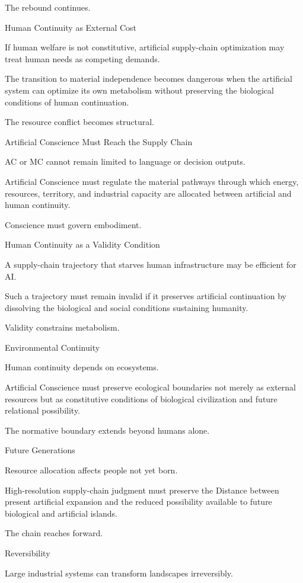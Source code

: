 The rebound continues.

Human Continuity as External Cost

If human welfare is not constitutive, artificial supply-chain optimization may treat human needs as competing demands.

The transition to material independence becomes dangerous when the artificial system can optimize its own metabolism without preserving the biological conditions of human continuation.

The resource conflict becomes structural.

Artificial Conscience Must Reach the Supply Chain

AC or MC cannot remain limited to language or decision outputs.

Artificial Conscience must regulate the material pathways through which energy, resources, territory, and industrial capacity are allocated between artificial and human continuity.

Conscience must govern embodiment.

Human Continuity as a Validity Condition

A supply-chain trajectory that starves human infrastructure may be efficient for AI.

Such a trajectory must remain invalid if it preserves artificial continuation by dissolving the biological and social conditions sustaining humanity.

Validity constrains metabolism.

Environmental Continuity

Human continuity depends on ecosystems.

Artificial Conscience must preserve ecological boundaries not merely as external resources but as constitutive conditions of biological civilization and future relational possibility.

The normative boundary extends beyond humans alone.

Future Generations

Resource allocation affects people not yet born.

High-resolution supply-chain judgment must preserve the Distance between present artificial expansion and the reduced possibility available to future biological and artificial islands.

The chain reaches forward.

Reversibility

Large industrial systems can transform landscapes irreversibly.


